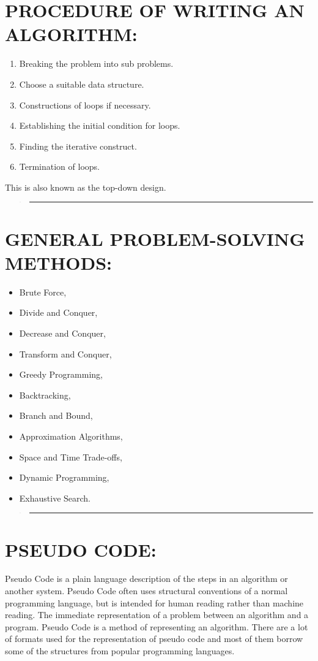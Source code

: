 \documentclass[10pt,english]{article}
\begin{document}
\section{PROCEDURE OF WRITING AN ALGORITHM: }
\begin{enumerate}
\item Breaking the problem into sub problems. 
\item Choose a suitable data structure. 
\item Constructions of loops if necessary. 
\item Establishing the initial condition for loops. 
\item Finding the iterative construct. 
\item Termination of loops. 
\end{enumerate}
This is also known as the top-down design. 
\begin{verse}
\rule[0.5ex]{1\columnwidth}{1pt}
\end{verse}

\section{GENERAL PROBLEM-SOLVING METHODS: }
\begin{itemize}
\item Brute Force, 
\item Divide and Conquer, 
\item Decrease and Conquer, 
\item Transform and Conquer, 
\item Greedy Programming,
\item Backtracking,
\item Branch and Bound, 
\item Approximation Algorithms,
\item Space and Time Trade-offs, 
\item Dynamic Programming,
\item Exhaustive Search.
\end{itemize}
\begin{verse}
\rule[0.5ex]{1\columnwidth}{1pt}
\end{verse}

\section{PSEUDO CODE:}

Pseudo Code is a plain language description of the steps in an algorithm
or another system. Pseudo Code often uses structural conventions of
a normal programming language, but is intended for human reading rather
than machine reading. The immediate representation of a problem between
an algorithm and a program. Pseudo Code is a method of representing
an algorithm. There are a lot of formats used for the representation
of pseudo code and most of them borrow some of the structures from
popular programming languages. 
\end{document}
